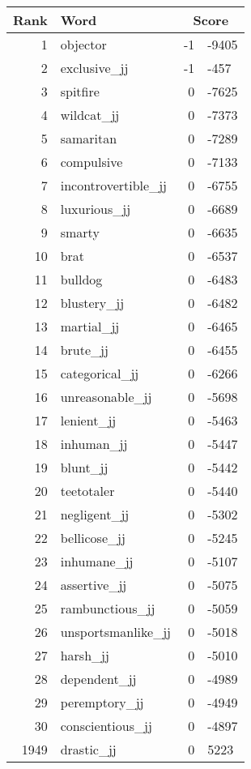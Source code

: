 \begin{longtable}[!htbp]{| rlr@{.}l |}
    \hline
    \textbf{Rank} & \textbf{Word} & \multicolumn{2}{c|}{\textbf{Score}} \\
    \hline
    \endhead
    1 & objector & -1 & -9405 \\
    2 & exclusive\_jj & -1 & -457 \\
    3 & spitfire & 0 & -7625 \\
    4 & wildcat\_jj & 0 & -7373 \\
    5 & samaritan & 0 & -7289 \\
    6 & compulsive & 0 & -7133 \\
    7 & incontrovertible\_jj & 0 & -6755 \\
    8 & luxurious\_jj & 0 & -6689 \\
    9 & smarty & 0 & -6635 \\
    10 & brat & 0 & -6537 \\
    11 & bulldog & 0 & -6483 \\
    12 & blustery\_jj & 0 & -6482 \\
    13 & martial\_jj & 0 & -6465 \\
    14 & brute\_jj & 0 & -6455 \\
    15 & categorical\_jj & 0 & -6266 \\
    16 & unreasonable\_jj & 0 & -5698 \\
    17 & lenient\_jj & 0 & -5463 \\
    18 & inhuman\_jj & 0 & -5447 \\
    19 & blunt\_jj & 0 & -5442 \\
    20 & teetotaler & 0 & -5440 \\
    21 & negligent\_jj & 0 & -5302 \\
    22 & bellicose\_jj & 0 & -5245 \\
    23 & inhumane\_jj & 0 & -5107 \\
    24 & assertive\_jj & 0 & -5075 \\
    25 & rambunctious\_jj & 0 & -5059 \\
    26 & unsportsmanlike\_jj & 0 & -5018 \\
    27 & harsh\_jj & 0 & -5010 \\
    28 & dependent\_jj & 0 & -4989 \\
    29 & peremptory\_jj & 0 & -4949 \\
    30 & conscientious\_jj & 0 & -4897 \\
    1949 & drastic\_jj & 0 & 5223 \\

\end{longtable}
